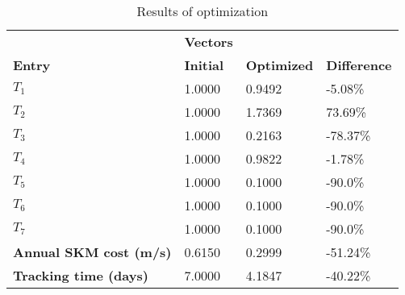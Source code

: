 \begin{table}[H]
\centering
\begin{tabular}{llll}
\textbf{}      & \cellcolor[HTML]{EFEFEF}\textbf{Vectors} & \textbf{} & \textbf{}         \\
\rowcolor[HTML]{EFEFEF} 
\textbf{Entry} & \textbf{Initial} & \textbf{Optimized} & \textbf{Difference} \\
$T_1$ & 1.0000 & 0.9492 & -5.08\% \\ 
$T_2$ & 1.0000 & 1.7369 & 73.69\% \\ 
$T_3$ & 1.0000 & 0.2163 & -78.37\% \\ 
$T_4$ & 1.0000 & 0.9822 & -1.78\% \\ 
$T_5$ & 1.0000 & 0.1000 & -90.0\% \\ 
$T_6$ & 1.0000 & 0.1000 & -90.0\% \\ 
$T_7$ & 1.0000 & 0.1000 & -90.0\% \\ 
\rowcolor[HTML]{EFEFEF} 
\textbf{Annual SKM cost (m/s)}  & 0.6150 & 0.2999 & -51.24\% \\ 
\rowcolor[HTML]{EFEFEF} 
\textbf{Tracking time (days)}  & 7.0000 & 4.1847 & -40.22\% \\ 
\end{tabular}
\caption{Results of optimization}
\label{tab:OptimizationAnalysis}
\end{table}